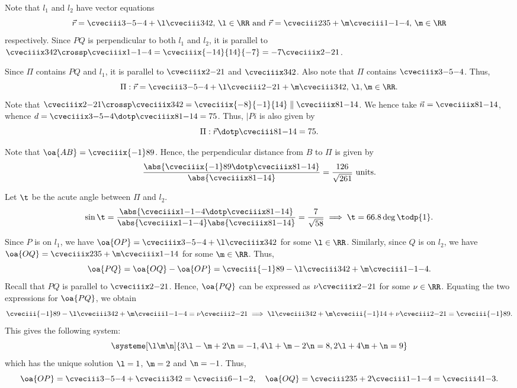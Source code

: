 \begin{solution}
    \begin{ppart}
        Note that $l_1$ and $l_2$ have vector equations \[\vec r = \cveciii3{-5}{-4} + \l\cveciii342, \, \l \in \RR \text{ and } \vec r = \cveciii235 + \m\cveciii1{-1}{-4}, \, \m \in \RR\] respectively. Since $PQ$ is perpendicular to both $l_1$ and $l_2$, it is parallel to $\cveciiix342 \crossp \cveciiix1{-1}{-4} = \cveciiix{-14}{14}{-7} = -7\cveciiix2{-2}1$.
    \end{ppart}
    \begin{ppart}
        Since $\Pi$ contains $PQ$ and $l_1$, it is parallel to $\cveciiix2{-2}1$ and $\cveciiix342$. Also note that $\Pi$ contains $\cveciiix3{-5}{-4}$. Thus, \[\Pi : \vec r = \cveciii3{-5}{-4} + \l \cveciii2{-2}1 + \m \cveciii342, \, \l, \m \in \RR.\] Note that $\cveciiix2{-2}1 \crossp \cveciiix342 = \cveciiix{-8}{-1}{14} \parallel \cveciiix81{-14}$. We hence take $\vec n = \cveciiix81{-14}$, whence $d = \cveciiix3{-5}{-4} \dotp \cveciiix81{-14} = 75$. Thus, $|Pi$ is also given by \[\Pi: \vec r \dotp \cveciii81{-14} = 75.\]
    \end{ppart}
    \begin{ppart}
        Note that $\oa{AB} = \cveciiix{-1}89$. Hence, the perpendicular distance from $B$ to $\Pi$ is given by \[\frac{\abs{\cveciiix{-1}89 \dotp \cveciiix81{-14}}}{\abs{\cveciiix81{-14}}} = \frac{126}{\sqrt{261}} \text{ units}.\]
    \end{ppart}
    \begin{ppart}
        Let $\t$ be the acute angle between $\Pi$ and $l_2$. \[\sin\t = \frac{\abs{\cveciiix1{-1}{-4} \dotp \cveciiix81{-14}}}{\abs{\cveciiix1{-1}{-4}} \abs{\cveciiix81{-14}}} = \frac{7}{\sqrt{58}} \implies \t = 66.8 \deg \todp{1}.\]
    \end{ppart}
    \begin{ppart}
        Since $P$ is on $l_1$, we have $\oa{OP} = \cveciiix3{-5}{-4} + \l\cveciiix342$ for some $\l \in \RR$. Similarly, since $Q$ is on $l_2$, we have $\oa{OQ} = \cveciiix235 + \m\cveciiix1{-1}4$ for some $\m \in \RR$. Thus, \[\oa{PQ} = \oa{OQ} - \oa{OP} = \cveciii{-1}89 - \l\cveciii342 + \m\cveciii1{-1}{-4}.\] Recall that $PQ$ is parallel to $\cveciiix2{-2}1$. Hence, $\oa{PQ}$ can be expressed as $\nu \cveciiix2{-2}1$ for some $\nu \in \RR$. Equating the two expressions for $\oa{PQ}$, we obtain \[\cveciii{-1}89 - \l\cveciii342 + \m\cveciii1{-1}{-4} = \nu \cveciii2{-2}1 \implies \l\cveciii342 + \m\cveciii{-1}14 + \nu \cveciii2{-2}1 = \cveciii{-1}89 .\] This gives the following system:
        \[\systeme[\l\m\n]{
                3\l - \m + 2\n = -1,
                4\l + \m -2\n = 8,
                2\l + 4\m + \n = 9
        }\] which has the unique solution $\l = 1$, $\m = 2$ and $\n = -1$. Thus, \[ \oa{OP} = \cveciii3{-5}{-4} + \cveciii342 = \cveciii6{-1}{-2}, \quad \oa{OQ} = \cveciii235 + 2\cveciii1{-1}{-4} = \cveciii41{-3}.\]
    \end{ppart}
\end{solution}

